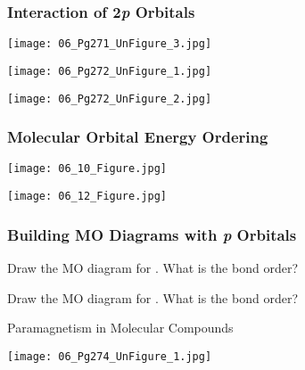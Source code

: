 \documentclass[notes=only]{beamer}
\begin{document}
\begin{frame}[c,allowframebreaks]
	\frametitle{Interaction of 2\textit{p} Orbitals}
	\begin{center}
		\texttt{[image: 06\_Pg271\_UnFigure\_3.jpg]}
	\end{center}

	\framebreak

	\begin{center}
		\texttt{[image: 06\_Pg272\_UnFigure\_1.jpg]}
	\end{center}

	\framebreak

	\begin{center}
		\texttt{[image: 06\_Pg272\_UnFigure\_2.jpg]}
	\end{center}
\end{frame}

\begin{frame}[c,allowframebreaks]
	\frametitle{Molecular Orbital Energy Ordering}
	\begin{center}
		\texttt{[image: 06\_10\_Figure.jpg]}
	\end{center}

	\framebreak

	\begin{center}
		\texttt{[image: 06\_12\_Figure.jpg]}
	\end{center}
\end{frame}

\begin{frame}[t,allowframebreaks]
	\frametitle{Building MO Diagrams with \textit{p} Orbitals}
	Draw the MO diagram for . What is the bond order?

	\framebreak

	Draw the MO diagram for . What is the bond order?

\end{frame}

\begin{frame}{Paramagnetism in Molecular Compounds}
	\begin{center}
		\texttt{[image: 06\_Pg274\_UnFigure\_1.jpg]}
	\end{center}
\end{frame}

\end{document}
